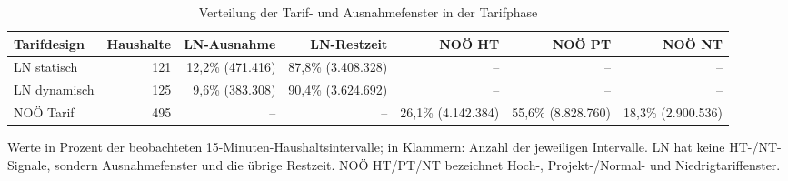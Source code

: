 \begin{table}[H]
\centering
\small
\caption{Verteilung der Tarif- und Ausnahmefenster in der Tarifphase}
\label{tab:tariff_window_exposure}
\begin{tabular}{lrrrrrr}
\toprule
Tarifdesign & Haushalte & LN-Ausnahme & LN-Restzeit & NOÖ HT & NOÖ PT & NOÖ NT \\
\midrule
LN statisch & 121 & 12,2\% (471.416) & 87,8\% (3.408.328) & -- & -- & -- \\
LN dynamisch & 125 & 9,6\% (383.308) & 90,4\% (3.624.692) & -- & -- & -- \\
NOÖ Tarif & 495 & -- & -- & 26,1\% (4.142.384) & 55,6\% (8.828.760) & 18,3\% (2.900.536) \\
\bottomrule
\end{tabular}
\begin{flushleft}
\footnotesize Werte in Prozent der beobachteten 15-Minuten-Haushaltsintervalle; in Klammern: Anzahl der jeweiligen Intervalle. LN hat keine HT-/NT-Signale, sondern Ausnahmefenster und die übrige Restzeit. NOÖ HT/PT/NT bezeichnet Hoch-, Projekt-/Normal- und Niedrigtariffenster.
\end{flushleft}
\end{table}
